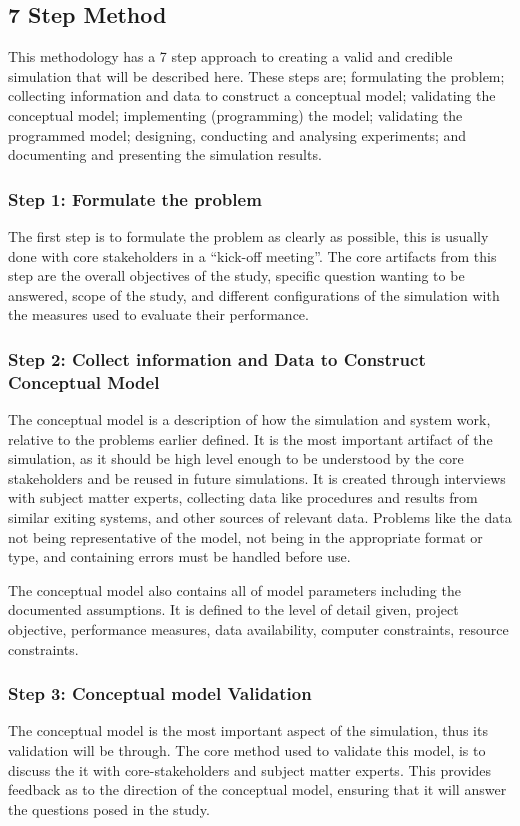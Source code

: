 \subsection{7 Step Method}
This methodology has a 7 step approach to creating a valid and credible simulation that will be described here.
These steps are; formulating the problem; collecting information and data to construct a conceptual model; validating the conceptual model;
implementing (programming) the model; validating the programmed model; designing, conducting and analysing experiments; and documenting and presenting the simulation results.

\subsubsection{Step 1: Formulate the problem}
The first step is to formulate the problem as clearly as possible, this is usually done with core stakeholders in a ``kick-off meeting''.
The core artifacts from this step are the overall objectives of the study, specific question wanting to be answered, scope of the study,
 and different configurations of the simulation with the measures used to evaluate their performance. 

\subsubsection{Step 2: Collect information and Data to Construct Conceptual Model}
The conceptual model is a description of how the simulation and system work, relative to the problems earlier defined.
It is the most important artifact of the simulation, as it should be high level enough to be understood by the core stakeholders
and be reused in future simulations.
It is created through interviews with subject matter experts, collecting data like procedures and results from similar exiting systems, and other sources of relevant data.
Problems like the data not being representative of the model, not being in the appropriate format or type, and containing errors must be handled before use.

The conceptual model also contains all of model parameters including the documented assumptions. 
It is defined to the level of detail given, project objective, performance measures, data availability, computer constraints, resource constraints.

\subsubsection{Step 3: Conceptual model Validation}
The conceptual model is the most important aspect of the simulation, thus its validation will be through.
The core method used to validate this model, is to discuss the it with core-stakeholders and subject matter experts.
This provides feedback as to the direction of the conceptual model, ensuring that it will answer the questions posed in the study.

